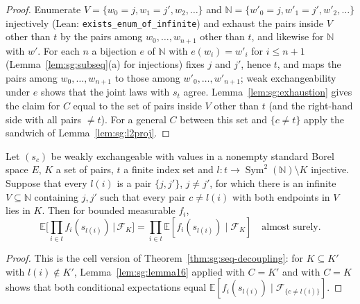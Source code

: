 \begin{proof}
  \leanok
{}
Enumerate $V=\{w_0=j,w_1=j',w_2,\dots\}$ and $\mathbb N=\{w'_0=j,w'_1=j',w'_2,\dots\}$ injectively (Lean: \texttt{exists\_enum\_of\_infinite}) and exhaust the pairs inside $V$ other than $t$ by the pairs among $w_0,\dots,w_{n+1}$ other than $t$,
and likewise for $\mathbb N$ with $w'$. For each $n$ a bijection $e$ of $\mathbb N$ with $e(w_i)=w'_i$ for $i\le n+1$ (Lemma~\ref{lem:sg:subseq}(a) for injections) fixes $j$ and $j'$, hence $t$, and maps the pairs among $w_0,\dots,w_{n+1}$ to those among $w'_0,\dots,w'_{n+1}$;
weak exchangeability under $e$ shows that the joint laws with $s_t$ agree. Lemma~\ref{lem:sg:exhaustion} gives the claim for $C$ equal to the set of pairs inside $V$ other than $t$ (and the right-hand side with all pairs $\ne t$). For a general $C$ between this set and
$\{c\ne t\}$ apply the sandwich of Lemma~\ref{lem:sg:l2proj}.
\end{proof}

\begin{theorem}\label{thm:sg:cond-indep-array}
  \leanok
Let $(s_c)$ be weakly exchangeable with values in a nonempty standard Borel space $E$, $K$ a set of pairs, $t$ a finite index set and $l:t\to\operatorname{Sym}^2(\mathbb N)\setminus K$ injective. Suppose that every $l(i)$ is a pair $\{j,j'\}$, $j\ne j'$, for which there is an infinite
$V\subseteq\mathbb N$ containing $j,j'$ such that every pair $c\ne l(i)$ with both endpoints in $V$ lies in $K$. Then for bounded measurable $f_i$,
\[\mathbb E\Big[\prod_{i\in t}f_i(s_{l(i)})\,\Big|\,\mathscr F_K\Big]=\prod_{i\in t}\mathbb E[f_i(s_{l(i)})\mid\mathscr F_K]\quad\text{almost surely.}\]
\end{theorem}

\begin{proof}
  \leanok
{}
This is the cell version of Theorem~\ref{thm:sg:seq-decoupling}: for $K\subseteq K'$ with $l(i)\notin K'$, Lemma~\ref{lem:sg:lemma16} applied with $C=K'$ and with $C=K$ shows that both conditional expectations equal $\mathbb E[f_i(s_{l(i)})\mid\mathscr F_{\{c\ne l(i)\}}]$.
\end{proof}

